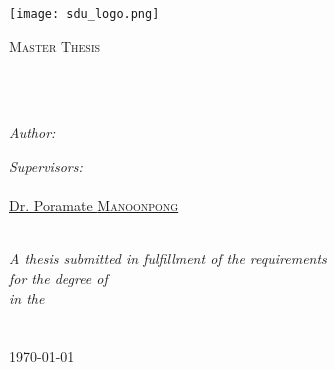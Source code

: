 \frontmatter %

\pagestyle{plain} %


\begin{titlepage}
\begin{center}
\texttt{[image: sdu\_logo.png]} %

{\scshape\LARGE \univname\par}\vspace{1.5cm} %
\textsc{\Large Master Thesis}\\[0.5cm] %

\HRule \\[0.4cm] %
{\huge \bfseries \ttitle\par}\vspace{0.4cm} %
\HRule \\[1.5cm] %
 
\begin{minipage}[t]{0.45\textwidth}
\begin{flushleft} \large
\emph{Author:}\\
\href{http://www.kitt.evee.cz}{\authorname}
\end{flushleft}
\end{minipage}
\begin{minipage}[t]{0.45\textwidth}
\begin{flushright} \large
\emph{Supervisors:} \\
\href{https://sites.google.com/site/ktomsite/}{\supname} \\
\href{http://manoonpong.com}{Dr. Poramate \textsc{Manoonpong}}
\end{flushright}
\end{minipage}\\[3cm]
 
\large \textit{A thesis submitted in fulfillment of the requirements\\ for the degree of \degreename}\\[0.3cm] %
\textit{in the}\\[0.4cm]
\groupname\\\deptname\\[2cm] %
 
{\large \today}\\[4cm] %
 
\vfill
\end{center}
\end{titlepage}